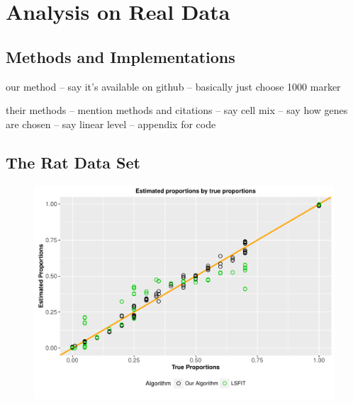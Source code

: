 \documentclass[reqno,12pt,oneside]{report}\usepackage[]{graphicx}\usepackage[]{color}
\makeatletter
\def\maxwidth{ %
  \ifdim\Gin@nat@width>\linewidth
    \linewidth
  \else
    \Gin@nat@width
  \fi
}
\newenvironment{knitrout}{}{} %
\renewenvironment{knitrout}{\begin{small}}{\end{small}}
\theoremstyle{plain}
\theoremstyle{definition}
\theoremstyle{remark}
\numberwithin{theorem}{chapter}     %
\makeatother
\begin{document}
 \chapter{Analysis on Real Data}
 \label{chap:Analysis}


\section{Methods and Implementations}

our method 
-- say it's available on github
-- basically just choose 1000 marker

their methods
-- mention methods and citations
-- say cell mix
-- say how genes are chosen
-- say linear level
-- appendix for code

\section{The Rat Data Set}

\begin{figure}
  \centering
\begin{knitrout}
\color{fgcolor}
\includegraphics[width=\maxwidth]{figure/plot1-1} 

\end{knitrout}
\end{figure}
\end{document}
